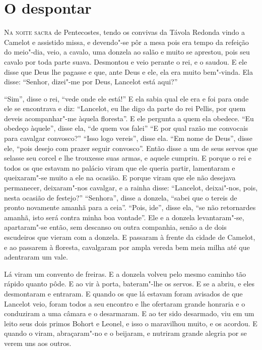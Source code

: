 
\begin{comment}
TRADUÇÃO DA VERSÃO ALEMÃ DE \textit{A DEMANDA DO SANTO GRAAL} (Códice 147 da
\textit{Bibliotheca Palatina Germaniae}, de Heidelberg, fins do século XIII). 
\end{comment}

\chapter{O despontar} 

\textsc{Na noite sacra} de Pentecostes, tendo os convivas da Távola Redonda vindo a
Camelot e assistido missa, e devendo"-se pôr a mesa pois era tempo da refeição do
meio"-dia, veio, a cavalo, uma donzela ao salão e muito se aprestou, pois seu
cavalo por toda parte suava. Desmontou e veio perante o rei, e o saudou. E ele
disse que Deus lhe pagasse e que, ante Deus e ele, ela era muito bem"-vinda. Ela
disse: “Senhor, dizei"-me por Deus, Lancelot está aqui?”

“Sim”, disse o rei, “vede onde ele está!” E ela sabia qual ele era e foi para
onde ele se encontrava e diz: “Lancelot, eu lhe digo da parte do rei Pellis,
por quem deveis acompanhar"-me àquela floresta”. E ele pergunta a quem ela
obedece. “Eu obedeço àquele”, disse ela, “de quem vos falei” “E por qual razão
me convocais para cavalgar convosco?” “Isso logo vereis”, disse ela. “Em nome
de Deus”, disse ele, “pois desejo com prazer seguir convosco”. Então disse a um
de seus servos que selasse seu corcel e lhe trouxesse suas armas, e aquele
cumpriu. E porque o rei e todos os que estavam no palácio viram que ele queria
partir, lamentaram e queixaram"-se muito a ele na ocasião. E porque viram que
ele não desejava permanecer, deixaram"-nos cavalgar, e a rainha disse:
“Lancelot, deixai"-nos, pois, nesta ocasião de festejo?” “Senhora”, disse a
donzela, “sabei que o tereis de pronto novamente amanhã para a ceia”. “Pois,
ide”, disse ela, “se não retornardes amanhã, isto será contra minha boa
vontade”. Ele e a donzela levantaram"-se, apartaram"-se então, sem descanso ou
outra companhia, senão a de dois escudeiros que vieram com a donzela. E
passaram à frente da cidade de Camelot, e ao passarem à floresta, cavalgaram por
ampla vereda bem meia milha até que adentraram um vale.

Lá viram um convento de freiras. E a donzela volveu pelo mesmo caminho tão
rápido quanto pôde. E ao vir à porta, bateram"-lhe os servos. E se a abriu, e
eles desmontaram e entraram. E quando os que lá estavam foram avisados de que
Lancelot veio, foram todos a seu encontro e lhe ofertaram grande honraria e o
conduziram a uma câmara e o desarmaram. E ao ter sido desarmado, viu em um
leito seus dois primos Bohort e Leonel, e isso o maravilhou muito, e os
acordou. E quando o viram, abraçaram"-no e o beijaram, e nutriram grande alegria
por se verem uns aos outros. 


